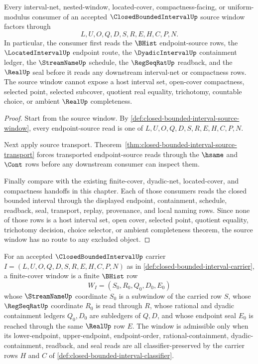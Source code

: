 \begin{theorem}
\label{thm:closed-bounded-interval-source-nonescape}
Every interval-net, nested-window, located-cover, compactness-facing, or uniform-modulus consumer of an accepted $\ClosedBoundedIntervalUp$ source window factors through
$$
L,U,O,Q,D,S,R,E,H,C,P,N .
$$
In particular, the consumer first reads the $\BHist$ endpoint-source rows, the $\LocatedIntervalUp$ endpoint route, the $\DyadicIntervalUp$ containment ledger, the $\StreamNameUp$ schedule, the $\RegSeqRatUp$ readback, and the $\RealUp$ seal before it reads any downstream interval-net or compactness rows. The source window cannot expose a host interval set, open-cover compactness, selected point, selected subcover, quotient real equality, trichotomy, countable choice, or ambient $\RealUp$ completeness.
\end{theorem}
\begin{proof}
Start from the source window. By \autoref{def:closed-bounded-interval-source-window}, every endpoint-source read is one of $L,U,O,Q,D,S,R,E,H,C,P,N$.

Next apply source transport. Theorem~\ref{thm:closed-bounded-interval-source-transport} forces transported endpoint-source reads through the $\hsame$ and $\Cont$ rows before any downstream consumer can inspect them.

Finally compare with the existing finite-cover, dyadic-net, located-cover, and compactness handoffs in this chapter. Each of those consumers reads the closed bounded interval through the displayed endpoint, containment, schedule, readback, seal, transport, replay, provenance, and local naming rows. Since none of those rows is a host interval set, open cover, selected point, quotient equality, trichotomy decision, choice selector, or ambient completeness theorem, the source window has no route to any excluded object.
\end{proof}

\begin{definition}
\label{def:closed-bounded-interval-finite-cover-window}
For an accepted $\ClosedBoundedIntervalUp$ carrier $I=(L,U,O,Q,D,S,R,E,H,C,P,N)$ as in \autoref{def:closed-bounded-interval-carrier}, a finite-cover window is a finite $\BHist$ row
$$
W_I=(S_0,R_0,Q_0,D_0,E_0)
$$
whose $\StreamNameUp$ coordinate $S_0$ is a subwindow of the carried row $S$, whose $\RegSeqRatUp$ coordinate $R_0$ is read through $R$, whose rational and dyadic containment ledgers $Q_0,D_0$ are subledgers of $Q,D$, and whose endpoint seal $E_0$ is reached through the same $\RealUp$ row $E$. The window is admissible only when its lower-endpoint, upper-endpoint, endpoint-order, rational-containment, dyadic-containment, readback, and seal reads are all classifier-preserved by the carrier rows $H$ and $C$ of \autoref{def:closed-bounded-interval-classifier}.
\end{definition}

